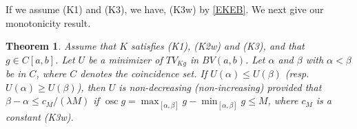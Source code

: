 \documentclass[11pt]{amsart} %
\numberwithin{equation}{section}
\newtheorem{thm}{Theorem}[section]
\begin{document}
If we assume (K1) and (K3), we have, (K3w) by \eqref{EKEB}.
 We next give our monotonicity result.
\begin{thm} \label{TMon}
Assume that $K$ satisfies (K1), (K2w) and (K3), and that $g\in C[a,b]$.
 Let $U$ be a minimizer of $TV_{Kg}$ in $BV(a,b)$.
 Let $\alpha$ and $\beta$ with $\alpha<\beta$ be in $C$, where $C$ denotes the coincidence set.
 If $U(\alpha)\leq U(\beta)$ (resp.\ $U(\alpha)\geq U(\beta)$), then $U$ is non-decreasing (non-increasing) provided that $\beta-\alpha\le c_M/(\lambda M)$ if $\operatorname{osc}g=\max_{[\alpha,\beta]}g-\min_{[\alpha,\beta]}g\leq M$, where $c_M$ is a constant (K3w).
\end{thm}
%
\end{document}
